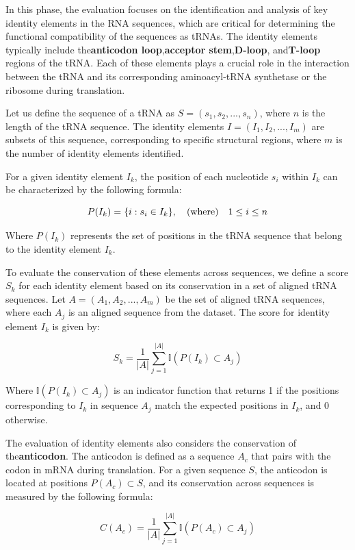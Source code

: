 In this phase, the evaluation focuses on the identification and analysis of key identity elements in the RNA sequences, which are critical for determining the functional compatibility of the sequences as tRNAs. The identity elements typically include the\textbf{anticodon loop},\textbf{acceptor stem},\textbf{D-loop}, and\textbf{T-loop} regions of the tRNA. Each of these elements plays a crucial role in the interaction between the tRNA and its corresponding aminoacyl-tRNA synthetase or the ribosome during translation.

Let us define the sequence of a tRNA as \( S = (s_1, s_2, ..., s_n) \), where \( n \) is the length of the tRNA sequence. The identity elements \( I = (I_1, I_2, ..., I_m) \) are subsets of this sequence, corresponding to specific structural regions, where \( m \) is the number of identity elements identified.

For a given identity element \( I_k \), the position of each nucleotide \( s_i \) within \( I_k \) can be characterized by the following formula:

\[
P(I_k) = \{i : s_i \in I_k \}, \quad \textnormal{(where)} \quad 1 \leq i \leq n
\]

Where \( P(I_k) \) represents the set of positions in the tRNA sequence that belong to the identity element \( I_k \).

To evaluate the conservation of these elements across sequences, we define a score \( S_k \) for each identity element based on its conservation in a set of aligned tRNA sequences. Let \( A = (A_1, A_2, ..., A_m) \) be the set of aligned tRNA sequences, where each \( A_j \) is an aligned sequence from the dataset. The score for identity element \( I_k \) is given by:

\[
S_k = \frac{1}{|A|} \sum_{j=1}^{|A|} \mathbb{I}(P(I_k) \subset A_j)
\]

Where \( \mathbb{I}(P(I_k) \subset A_j) \) is an indicator function that returns 1 if the positions corresponding to \( I_k \) in sequence \( A_j \) match the expected positions in \( I_k \), and 0 otherwise.

The evaluation of identity elements also considers the conservation of the\textbf{anticodon}. The anticodon is defined as a sequence \( A_c \) that pairs with the codon in mRNA during translation. For a given sequence \( S \), the anticodon is located at positions \( P(A_c) \subset S \), and its conservation across sequences is measured by the following formula:

\[
C(A_c) = \frac{1}{|A|} \sum_{j=1}^{|A|} \mathbb{I}(P(A_c) \subset A_j)
\]

